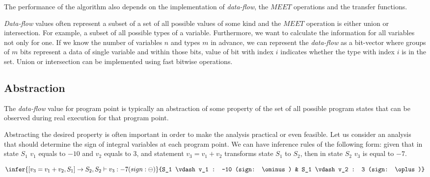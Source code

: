         The performance of the algorithm also depends on the implementation 
        of \emph{data-flow}, the $\textit{MEET}$ operations and the transfer 
        functions. 
        
        \emph{Data-flow} values often represent a subset of a set of 
        all possible values of some kind 
        and the $\textit{MEET}$ operation is either union or intersection.
        For example, a subset of all possible types of a variable. 
        Furthermore, we want to calculate the information for all 
        variables not only for one. If we know the number of variables $n$ and 
        types $m$ in advance, we can represent the \emph{data-flow} as 
        a bit-vector where groups of $m$ bits represent a data of 
        single variable and within those bits, value of bit with 
        index $i$ indicates whether the type with index $i$ is in the set. 
        Union or intersection can be implemented using fast bitwise operations.


        \subsection{Abstraction}
        
        The \emph{data-flow} value for program point is typically an abstraction 
        of some property of the set of all possible program states that can be 
        observed during real execution for that program point. 
        
        Abstracting the desired property is often important in order to make 
        the analysis practical or even feasible. Let us consider an analysis 
        that should determine the sign of integral variables at each program point.
        We can have inference rules of the following form: given that in state 
        $S_1$ $v_1$ equals to $-10$ and $v_2$ equals to $3$, and statement 
        $v_3=v_1+v_2$ transforms state $S_1$ to $S_2$, then in state $S_2$ 
        $v_3$ is equal to $-7$.
        
        $$
        \infer{[v_3=v_1+v_2, S_1] \rightarrow S_2, S_2 \vdash v_3 : -7 (sign: \ominus)}
        {S_1 \vdash v_1 : -10 (sign: \ominus) & S_1 \vdash v_2 : 3 (sign: \oplus)}
        $$
        

